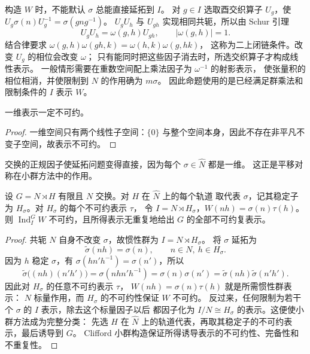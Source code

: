 构造 $W$ 时，不能默认 $\sigma$ 总能直接延拓到 $I$。
对 $g\in I$ 选取酉交织算子 $U_g$，使
$U_g\sigma(n)U_g^{-1}=\sigma(gng^{-1})$。
$U_gU_h$ 与 $U_{gh}$ 实现相同共轭，所以由 Schur 引理
\[
U_gU_h=\omega(g,h)U_{gh},\qquad |\omega(g,h)|=1.
\]
结合律要求
$\omega(g,h)\omega(gh,k)=\omega(h,k)\omega(g,hk)$，
这称为二上闭链条件。改变 $U_g$ 的相位会改变 $\omega$；
只有能同时把这些因子消去时，所选交织算子才构成线性表示。
一般情形需要在重数空间配上乘法因子为 $\omega^{-1}$ 的射影表示，
使张量积的相位相消，并使限制到 $N$ 的作用确为 $m\sigma$。
因此命题使用的是已经满足群乘法和限制条件的 $I$ 表示 $W$。

\begin{proposition}
一维表示一定不可约。
\end{proposition}

\begin{proof}
一维空间只有两个线性子空间：$\{0\}$ 与整个空间本身，因此不存在非平凡不变子空间，故表示不可约。
\end{proof}


交换的正规因子使延拓问题变得直接，因为每个 $\sigma\in\widehat N$ 都是一维。
这正是平移对称在小群方法中的作用。

\begin{proposition}[交换正规因子的半直积小群分类]
设 $G=N\rtimes H$ 有限且 $N$ 交换。对 $H$ 在 $\widehat N$ 上的每个轨道
取代表 $\sigma$，记其稳定子为 $H_\sigma$。对 $H_\sigma$ 的每个不可约表示 $\tau$，
令 $I=N\rtimes H_\sigma$，$W(nh)=\sigma(n)\tau(h)$。则
$\operatorname{Ind}_I^GW$ 不可约，且所得表示无重复地给出 $G$ 的全部不可约复表示。
\end{proposition}

\begin{proof}
共轭 $N$ 自身不改变 $\sigma$，故惯性群为 $I=N\rtimes H_\sigma$。
将 $\sigma$ 延拓为
\[
\widetilde\sigma(nh)=\sigma(n),\qquad n\in N,\ h\in H_\sigma.
\]
因为 $h$ 稳定 $\sigma$，有 $\sigma(hn'h^{-1})=\sigma(n')$，所以
\[
\widetilde\sigma\bigl((nh)(n'h')\bigr)
=\sigma(nhn'h^{-1})=\sigma(n)\sigma(n')
=\widetilde\sigma(nh)\widetilde\sigma(n'h').
\]
因此对 $H_\sigma$ 的任意不可约表示 $\tau$，
$W(nh)=\sigma(n)\tau(h)$ 就是所需惯性群表示：
$N$ 标量作用，而 $H_\sigma$ 的不可约性保证 $W$ 不可约。
反过来，任何限制为若干个 $\sigma$ 的 $I$ 表示，除去这个标量因子以后
都因子化为 $I/N\cong H_\sigma$ 的表示。这便使小群方法成为完整分类：
先选 $H$ 在 $\widehat N$ 上的轨道代表，再取其稳定子的不可约表示，最后诱导到 $G$。
Clifford 小群构造保证所得诱导表示的不可约性、完备性和不重复性。
\end{proof}

